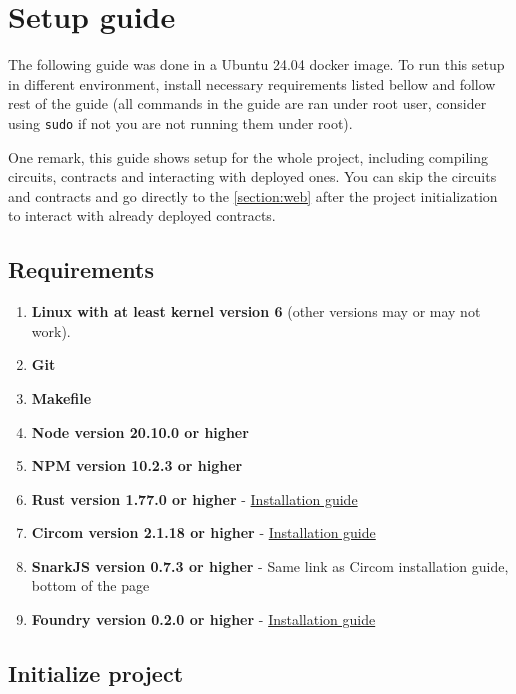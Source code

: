 \thispagestyle{empty}
\renewcommand*{\thepage}{C-\arabic{page}}

\chapter{Setup guide}

The following guide was done in a Ubuntu 24.04 docker image.
To run this setup in different environment, install necessary requirements
listed bellow and follow rest of the guide (all commands in the guide are
ran under root user, consider using \texttt{sudo} if not you are not running
them under root).

One remark, this guide shows setup for the whole project, including compiling
circuits, contracts and interacting with deployed ones. You can skip the
circuits and contracts and go directly to the \ref{section:web} after the
project initialization to interact with already deployed contracts.

\section{Requirements}

\begin{enumerate}
    \item \textbf{Linux with at least kernel version 6} (other versions may or may not work).
    \item \textbf{Git}
    \item \textbf{Makefile}
    \item \textbf{Node version 20.10.0 or higher}
    \item \textbf{NPM version 10.2.3 or higher}
    \item \textbf{Rust version 1.77.0 or higher} - \href{https://www.rust-lang.org/tools/install}{Installation guide}
    \item \textbf{Circom version 2.1.18 or higher} - \href{https://docs.circom.io/getting-started/installation/}{Installation guide}
    \item \textbf{SnarkJS version 0.7.3 or higher} - Same link as Circom installation guide, bottom of the page 
    \item \textbf{Foundry version 0.2.0 or higher} - \href{https://getfoundry.sh/}{Installation guide}
\end{enumerate}


\section{Initialize project}

